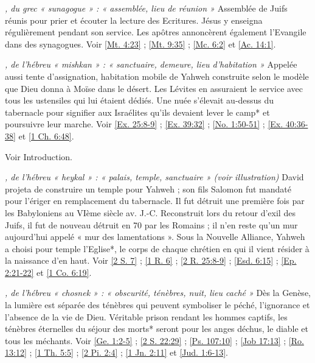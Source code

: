 \begin{multicols}{2}
\textit{, du grec « sunagogue » : « assemblée, lieu de réunion »}\newline
Assemblée de Juifs réunis pour prier et écouter la lecture des Ecritures. Jésus y enseigna régulièrement pendant son service. Les apôtres annoncèrent également l'Evangile dans des synagogues. Voir \vref{Mt. 4:23} ; \vref{Mt. 9:35} ; \vref{Mc. 6:2} et \vref{Ac. 14:1}.

\textit{, de l'hébreu « mishkan » : « sanctuaire, demeure, lieu d'habitation »}\newline
Appelée aussi tente d'assignation, habitation mobile de Yahweh construite selon le modèle que Dieu donna à Moïse dans le désert. Les Lévites en assuraient le service avec tous les ustensiles qui lui étaient dédiés. Une nuée s'élevait au-dessus du tabernacle pour signifier aux Israélites qu'ils devaient lever le camp* et poursuivre leur marche. Voir \vref{Ex. 25:8-9} ; \vref{Ex. 39:32} ; \vref{No. 1:50-51} ; \vref{Ex. 40:36-38} et \vref{1 Ch. 6:48}.

\textit{}\newline
Voir Introduction.

\textit{, de l'hébreu « heykal » : « palais, temple, sanctuaire » (voir illustration)}\newline
David projeta de construire un temple pour Yahweh ; son fils Salomon fut mandaté pour l'ériger en remplacement du tabernacle. Il fut détruit une première fois par les Babyloniens au VIème siècle av. J.-C. Reconstruit lors du retour d'exil des Juifs, il fut de nouveau détruit en 70 par les Romains ; il n'en reste qu'un mur aujourd'hui appelé « mur des lamentations ». Sous la Nouvelle Alliance, Yahweh a choisi pour temple l'Eglise*, le corps de chaque chrétien en qui il vient résider à la naissance d'en haut. Voir \vref{2 S. 7} ; \vref{1 R. 6} ; \vref{2 R. 25:8-9} ; \vref{Esd. 6:15} ; \vref{Ep. 2:21-22} et \vref{1 Co. 6:19}.

\textit{, de l'hébreu « chosnek » : « obscurité, ténèbres, nuit, lieu caché »}\newline
Dès la Genèse, la lumière est séparée des ténèbres qui peuvent symboliser le péché, l'ignorance et l'absence de la vie de Dieu. Véritable prison rendant les hommes captifs, les ténèbres éternelles du séjour des morts* seront pour les anges déchus, le diable et tous les méchants. Voir \vref{Ge. 1:2-5} ; \vref{2 S. 22:29} ; \vref{Ps. 107:10} ; \vref{Job 17:13} ; \vref{Ro. 13:12} ; \vref{1 Th. 5:5} ; \vref{2 Pi. 2:4} ; \vref{1 Jn. 2:11} et \vref{Jud. 1:6-13}.


\end{multicols}
